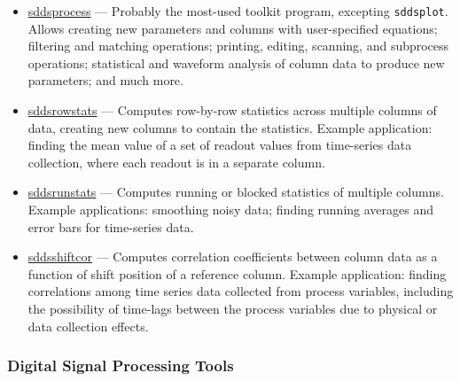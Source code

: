 \documentclass[11pt]{article}
\newcommand{\progref}[1]{\hyperref{#1}{{\tt #1} (}{)}{#1}}
\begin{document}
\begin{itemize}
\item \progref{sddsprocess} --- Probably the most-used toolkit program, excepting \verb|sddsplot|.  Allows
creating new parameters and columns with user-specified equations; filtering and matching operations; printing,
editing, scanning, and subprocess operations; statistical and waveform analysis of column data to produce new
parameters; and much more.

\item \progref{sddsrowstats} --- Computes row-by-row statistics across multiple columns of data, creating
new columns to contain the statistics.  Example application: finding the mean value of a set of readout
values from time-series data collection, where each readout is in a separate column.

\item \progref{sddsrunstats} --- Computes running or blocked statistics of multiple columns.  Example
applications: smoothing noisy data; finding running averages and error bars for time-series data.

\item \progref{sddsshiftcor} --- Computes correlation coefficients
between column data as a function of shift position of a reference
column.  Example application: finding correlations among time series
data collected from process variables, including the possibility of
time-lags between the process variables due to physical or data
collection effects.

\end{itemize}

\subsubsection{Digital Signal Processing Tools}
\end{document}
